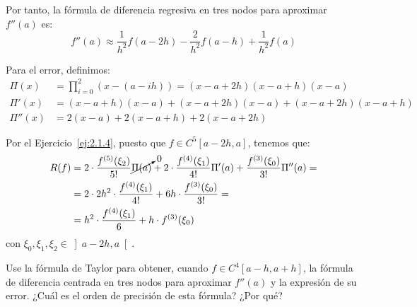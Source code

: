 \begin{ejercicio}
    Por tanto, la fórmula de diferencia regresiva en tres nodos para aproximar $f''(a)$ es:
    \[
    f''(a) \approx \frac{1}{h^2}f(a - 2h) - \frac{2}{h^2}f(a - h) + \frac{1}{h^2}f(a)
    \]

    Para el error, definimos:
    \begin{align*}
        \Pi(x) &= \prod_{i=0}^{2}(x - (a - ih)) = (x - a + 2h)(x - a + h)(x - a)\\
        \Pi'(x) &= (x-a+h)(x-a) + (x-a+2h)(x-a) + (x-a+2h)(x-a+h)\\
        \Pi''(x) &= 2(x-a) + 2(x-a+h) + 2(x-a+2h)
    \end{align*}

    Por el Ejercicio~\ref{ej:2.1.4}, puesto que $f \in C^5[a - 2h, a]$, tenemos que:
    \begin{align*}
        R(f) &= 2\cdot \frac{f^{(5)}(\xi_2)}{5!}\cancelto{0}{\Pi(a)} + 2\cdot \frac{f^{(4)}(\xi_1)}{4!}\Pi'(a) + \frac{f^{(3)}(\xi_0)}{3!}\Pi''(a)
        =\\&=2\cdot 2h^2\cdot \frac{f^{(4)}(\xi_1)}{4!} + 6h\cdot \frac{f^{(3)}(\xi_0)}{3!}
        =\\&=h^2\cdot \frac{f^{(4)}(\xi_1)}{6} + h\cdot f^{(3)}(\xi_0)
    \end{align*}
    con $\xi_0, \xi_1, \xi_2 \in \left] a-2h, a \right[$.
\end{ejercicio}

\begin{ejercicio}\label{ej:2.1.6}
    Use la fórmula de Taylor para obtener, cuando $f \in C^4[a - h, a + h]$, la fórmula de diferencia centrada en tres nodos para aproximar $f''(a)$ y la expresión de su error. ¿Cuál es el orden de precisión de esta fórmula? ¿Por qué?
\end{ejercicio}

